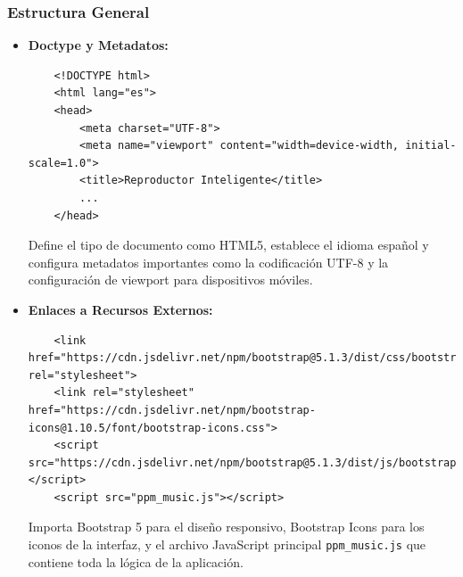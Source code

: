 \documentclass[a4paper,12pt]{article}
\begin{document}
\subsubsection{Estructura General}
\begin{itemize}
    \item \textbf{Doctype y Metadatos:}
    \begin{verbatim}
    <!DOCTYPE html>
    <html lang="es">
    <head>
        <meta charset="UTF-8">
        <meta name="viewport" content="width=device-width, initial-scale=1.0">
        <title>Reproductor Inteligente</title>
        ...
    </head>
    \end{verbatim}
    Define el tipo de documento como HTML5, establece el idioma español y configura metadatos importantes como la codificación UTF-8 y la configuración de viewport para dispositivos móviles.

    \item \textbf{Enlaces a Recursos Externos:}
    \begin{verbatim}
    <link href="https://cdn.jsdelivr.net/npm/bootstrap@5.1.3/dist/css/bootstrap.min.css" rel="stylesheet">
    <link rel="stylesheet" href="https://cdn.jsdelivr.net/npm/bootstrap-icons@1.10.5/font/bootstrap-icons.css">
    <script src="https://cdn.jsdelivr.net/npm/bootstrap@5.1.3/dist/js/bootstrap.bundle.min.js"></script>
    <script src="ppm_music.js"></script>
    \end{verbatim}
    Importa Bootstrap 5 para el diseño responsivo, Bootstrap Icons para los iconos de la interfaz, y el archivo JavaScript principal \texttt{ppm\_music.js} que contiene toda la lógica de la aplicación.
\end{itemize}
\end{document}
